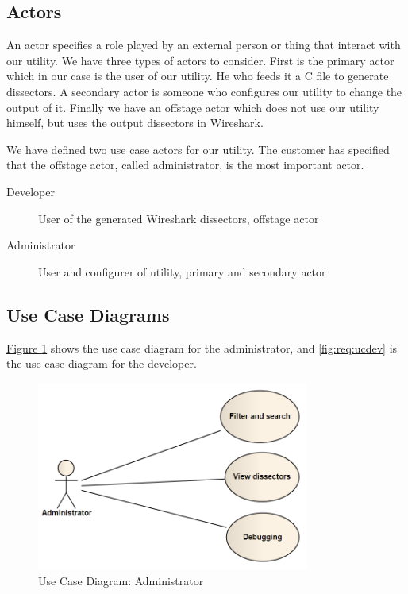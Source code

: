 \subsection{Actors}
An actor specifies a role played by an external person or thing that interact
with our utility. We have three types of actors to consider. First is the
primary actor which in our case is the user of our utility. He who feeds it a
C file to generate dissectors. A secondary actor is someone who configures our
utility to change the output of it. Finally we have an offstage actor which
does not use our utility himself, but uses the output dissectors in Wireshark.

We have defined two use case actors for our utility. The customer has specified
that the offstage actor, called administrator, is the most important actor.
\begin{description}
	\item[Developer] User of the generated Wireshark dissectors, offstage actor
	\item[Administrator] User and configurer of utility, primary and secondary actor
\end{description}

\subsection{Use Case Diagrams}
\hyperref[fig:req:ucadm]{Figure \ref*{fig:req:ucadm}} shows the use case
diagram for the administrator, and \autoref{fig:req:ucdev} is the use case
diagram for the developer.
\begin{figure}[htbp]
	\center
	\includegraphics[width=0.8\textwidth]{./planning/img/administrator}
	\caption{Use Case Diagram: Administrator\label{fig:req:ucadm}}
\end{figure}

